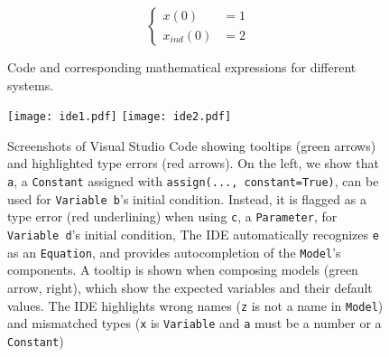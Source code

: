 \begin{figure*}[t]
\begin{minipage}[t]{\linewidth}
{\begin{minipage}[c]{0.2\linewidth}
{    \[
    \begin{cases}
        x(0) &= 1 \\
        x_{ind}(0) &= 2
    \end{cases}
    \]
    
    }
    
    \end{minipage}%
    
    
    }
    
    \end{minipage}%
    
    \caption{\label{fig-poincare}Code and corresponding mathematical
    expressions for different systems.}
    
    \end{figure*}
    
  
\begin{figure}[t]
  \texttt{[image: ide1.pdf]}
  \texttt{[image: ide2.pdf]}
  \caption{
    \label{fig-ide}
    Screenshots of Visual Studio Code showing
    tooltips (green arrows) and
    highlighted type errors (red arrows).
    On the left,
    we show that \texttt{a},
    a \texttt{Constant} assigned with \texttt{assign(...,\ constant=True)},
    can be used for \texttt{Variable b}'s initial condition.
    Instead,
    it is flagged as a type error (red underlining)
    when using \texttt{c}, a \texttt{Parameter},
    for \texttt{Variable d}'s initial condition,
    The IDE automatically recognizes \texttt{e} as an \texttt{Equation},
    and provides autocompletion of the \texttt{Model}'s components.
    A tooltip is shown when composing models (green arrow, right),
    which show the expected variables and their default values.
    The IDE highlights wrong names (\texttt{z} is not a name in \texttt{Model})
    and mismatched types (\texttt{x} is \texttt{Variable} and \texttt{a} must be a number or a \texttt{Constant})
  }  
\end{figure}
  
